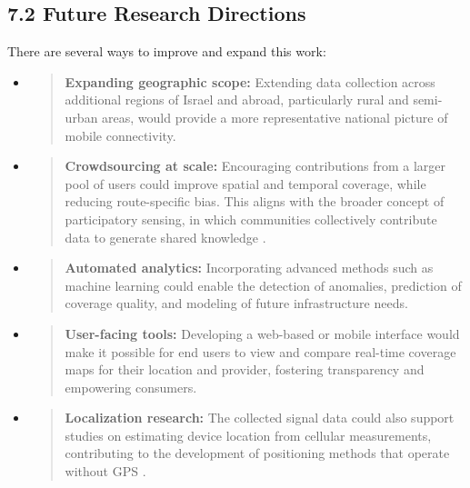 \documentclass[11pt]{article}
\begin{document}
\hypertarget{future-research-directions}{%
\subsection{7.2 Future Research
Directions}\label{future-research-directions}}

There are several ways to improve and expand this work:

\begin{itemize}
\item
  \begin{quote}
  \textbf{Expanding geographic scope:} Extending data collection across
  additional regions of Israel and abroad, particularly rural and semi-urban areas,
  would provide a more representative national picture of mobile
  connectivity.
  \end{quote}
\item
  \begin{quote}
  \textbf{Crowdsourcing at scale:} Encouraging contributions from a
  larger pool of users could improve spatial and temporal coverage,
  while reducing route-specific bias. This aligns with the broader
  concept of participatory sensing, in which communities collectively
  contribute data to generate shared knowledge \cite{burke2006}.
  \end{quote}
\item
  \begin{quote}
  \textbf{Automated analytics:} Incorporating advanced methods such as
  machine learning could enable the detection of anomalies, prediction
  of coverage quality, and modeling of future infrastructure needs.
  \end{quote}
\item
  \begin{quote}
  \textbf{User-facing tools:} Developing a web-based or mobile interface
  would make it possible for end users to view and compare real-time
  coverage maps for their location and provider, fostering transparency
  and empowering consumers.
  \end{quote}
\item
  \begin{quote}
  \textbf{Localization research:} The collected signal data could also
  support studies on estimating device location from cellular
  measurements, contributing to the development of positioning methods
  that operate without GPS \cite{youssef2005locating,bahl2000radar,kaplan2017}.
  \end{quote}

\end{itemize}
\end{document}
